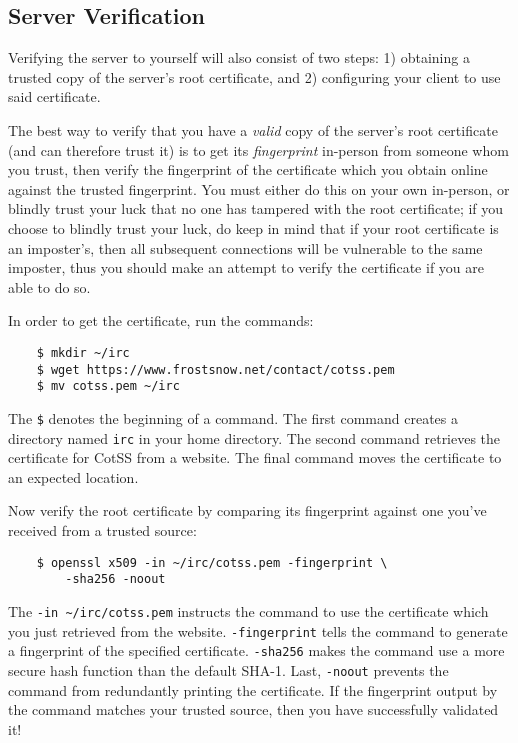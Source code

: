 \documentclass{article}
\begin{document}
\subsection{Server Verification}
Verifying the server to yourself will also consist of two steps: 1) obtaining a trusted copy of the server's root certificate, and 2) configuring your client to use said certificate.

The best way to verify that you have a \emph{valid} copy of the server's root certificate (and can therefore trust it) is to get its \emph{fingerprint} in-person from someone whom you trust, then verify the fingerprint of the certificate which you obtain online against the trusted fingerprint.  You must either do this on your own in-person, or blindly trust your luck that no one has tampered with the root certificate; if you choose to blindly trust your luck, do keep in mind that if your root certificate is an imposter's, then all subsequent connections will be vulnerable to the same imposter, thus you should make an attempt to verify the certificate if you are able to do so.

In order to get the certificate, run the commands:
\begin{lstlisting}
    $ mkdir ~/irc
    $ wget https://www.frostsnow.net/contact/cotss.pem
    $ mv cotss.pem ~/irc
\end{lstlisting}
The \texttt{\$} denotes the beginning of a command.  The first command creates a directory named \texttt{irc} in your home directory.  The second command retrieves the certificate for CotSS from a website.  The final command moves the certificate to an expected location.

Now verify the root certificate by comparing its fingerprint against one you've received from a trusted source:
\begin{lstlisting}
    $ openssl x509 -in ~/irc/cotss.pem -fingerprint \
        -sha256 -noout
\end{lstlisting}
The \texttt{-in \textasciitilde/irc/cotss.pem} instructs the command to use the certificate which you just retrieved from the website.  \texttt{-fingerprint} tells the command to generate a fingerprint of the specified certificate.  \texttt{-sha256} makes the command use a more secure hash function than the default SHA-1.  Last, \texttt{-noout} prevents the command from redundantly printing the certificate.  If the fingerprint output by the command matches your trusted source, then you have successfully validated it!
\end{document}

